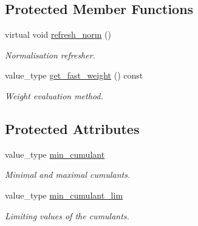 \subsection*{Protected Member Functions}
\begin{DoxyCompactItemize}
\item 
\hypertarget{a00317_aaf876bf50c4a3d4bc2ada686293bbb1f}{virtual void \hyperlink{a00317_aaf876bf50c4a3d4bc2ada686293bbb1f}{refresh\-\_\-norm} ()}\label{a00317_aaf876bf50c4a3d4bc2ada686293bbb1f}

\begin{DoxyCompactList}\small\item\em Normalisation refresher. \end{DoxyCompactList}\item 
\hypertarget{a00317_a3cb456621edb32aceb3dc48d8cf44cc3}{value\-\_\-type \hyperlink{a00317_a3cb456621edb32aceb3dc48d8cf44cc3}{get\-\_\-fast\-\_\-weight} () const }\label{a00317_a3cb456621edb32aceb3dc48d8cf44cc3}

\begin{DoxyCompactList}\small\item\em Weight evaluation method. \end{DoxyCompactList}\end{DoxyCompactItemize}
\subsection*{Protected Attributes}
\begin{DoxyCompactItemize}
\item 
\hypertarget{a00317_a84dd2ec873372b09661f0a741288082f}{value\-\_\-type \hyperlink{a00317_a84dd2ec873372b09661f0a741288082f}{min\-\_\-cumulant}}\label{a00317_a84dd2ec873372b09661f0a741288082f}

\begin{DoxyCompactList}\small\item\em Minimal and maximal cumulants. \end{DoxyCompactList}\item 
\hypertarget{a00317_a13fab27b5534acce013ed27576d26f45}{value\-\_\-type \hyperlink{a00317_a13fab27b5534acce013ed27576d26f45}{min\-\_\-cumulant\-\_\-lim}}\label{a00317_a13fab27b5534acce013ed27576d26f45}

\begin{DoxyCompactList}\small\item\em Limiting values of the cumulants. \end{DoxyCompactList}\end{DoxyCompactItemize}
